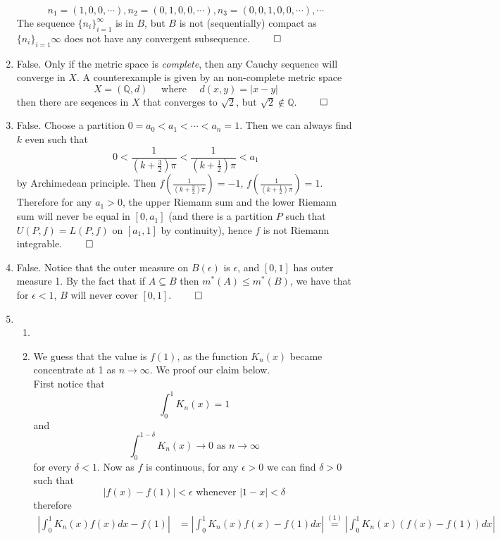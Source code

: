 \begin{enumerate}
\[        n_1 = (1,0,0,\cdots), n_2 = (0,1,0,0, \cdots), n_3 = (0,0,1,0,0,\cdots), \cdots
        \]
        The sequence $\{n_i\}_{i=1}^\infty$ is in $B$, but $B$ is not (sequentially) compact as $\{n_i\}_{i=1}\infty$ does not have any convergent subsequence.  $\qed$
        \item False. Only if the metric space is \textit{complete}, then any Cauchy sequence will converge in $X$. A counterexample is given by an non-complete metric space
        \[
        X = (\mathbb{Q}, d) \quad \text{ where } \quad d(x,y) = |x-y|
        \]
        then there are seqences in $X$ that converges to $\sqrt{2}$, but $\sqrt{2} \notin \mathbb{Q}$. $\qed$
        \item False. Choose a partition $0 = a_0 < a_1 < \cdots < a_n = 1$. Then we can always find $k$ even such that
        \[
        0 < \frac{1}{(k+\frac{3}{2})\pi} < \frac{1}{(k+\frac{1}{2})\pi} < a_1
        \]
        by Archimedean principle. Then $f\left(\frac{1}{(k+\frac{3}{2})\pi}\right) = -1$, $f\left(\frac{1}{(k+\frac{1}{2})\pi}\right) = 1$. Therefore for any $a_1 > 0$, the upper Riemann sum and the lower Riemann sum will never be equal in $[0,a_1]$ (and there is a partition $P$ such that $U(P, f) = L(P, f)$ on $[a_1, 1]$ by continuity), hence $f$ is not Riemann integrable. $\qed$
        \item False. Notice that the outer measure on $B(\epsilon)$ is $\epsilon$, and $[0,1]$ has outer measure 1. By the fact that if $A \subseteq B$ then $m^*(A) \leq m^*(B)$, we have that for $\epsilon < 1$, $B$ will never cover $[0,1]$. $\qed$
        \item 
        \begin{enumerate}
            \item 
            \item We guess that the value is $f(1)$, as the function $K_n(x)$ became concentrate at 1 as $n \to \infty$. We proof our claim below. \\
            First notice that 
            \[
            \int_0^1 K_n(x) = 1   \tag{1} 
            \]
            and
            \[
            \int_0^{1-\delta} K_n(x) \to 0 \text{ as } n \to \infty \tag{2}
            \]
            for every $\delta < 1$. Now as $f$ is continuous, for any $\epsilon > 0$ we can find $\delta > 0$ such that
            \[
            |f(x)-f(1)| < \epsilon \text{ whenever } |1-x| < \delta
            \]
            therefore
            \begin{align*}
            \left|\int^1_0 K_n(x) f(x) dx - f(1) \right| &= \left|\int^1_0 K_n(x) f(x) - f(1) dx \right| \overset{(1)}{=} \left|\int^1_0 K_n(x) (f(x) -  f(1)) dx\right| \\

\end{align*}
\end{enumerate}
\end{enumerate}
